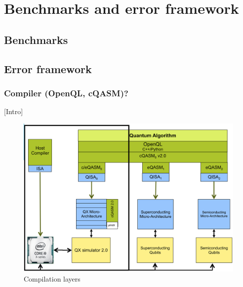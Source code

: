
\chapter*{Benchmarks and error framework}
\label{sec:org07a3124}
\section*{Benchmarks}
\label{sec:org0477026}
\section*{Error framework}
\label{sec:org0ebc613}
\subsection*{Compiler (OpenQL, cQASM)?}
\label{sec:orgcd218d9}

[Intro]


\begin{figure}[htbp]
\centering
\includegraphics[width=\textwidth]{figures/layers.png}
\caption{\label{fig:orge3242a5}
Compilation layers}
\end{figure}


